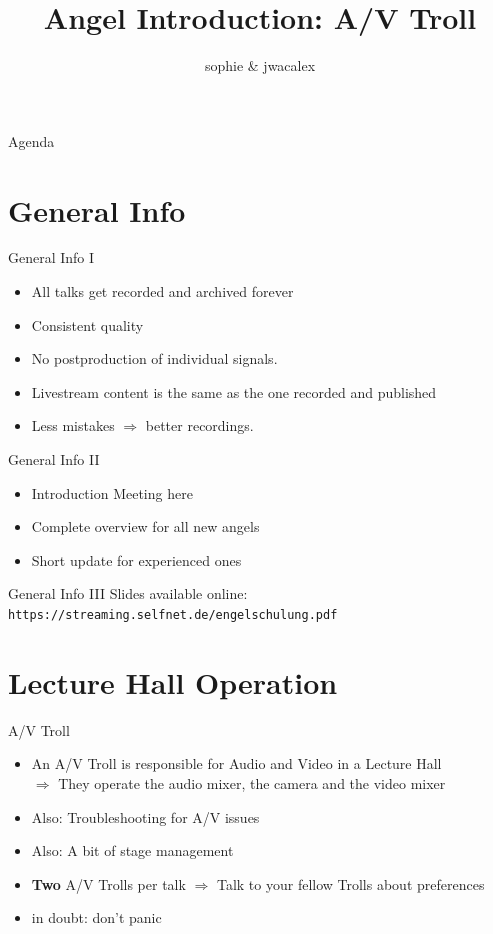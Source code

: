 \documentclass[aspectratio=169]{beamer}
\title{Angel Introduction: A/V Troll}
\author{sophie \& jwacalex}
\institute{C3VOC}
\begin{document}
\maketitle


\begin{frame}{Agenda}
\tableofcontents
\end{frame}


\section{General Info}
\begin{frame}{General Info I}
	\begin{itemize}
		\item All talks get recorded and archived forever
		\item Consistent quality
		\item No postproduction of individual signals.
		\item Livestream content is the same as the one recorded and published
		\item Less mistakes $\Rightarrow$ better recordings.
	\end{itemize}
\end{frame}


\begin{frame}{General Info II}
	\begin{itemize}
		\item Introduction Meeting here
		\item Complete overview for all new angels
		\item Short update for experienced ones
	\end{itemize}
\end{frame}

\begin{frame}{General Info III}
Slides available online: \texttt{https://streaming.selfnet.de/engelschulung.pdf}

	\begin{figure} 
		\centering
	\end{figure}
\end{frame}

\section{Lecture Hall Operation}
\begin{frame}{A/V Troll}
	\begin{itemize}
		\item An A/V Troll is responsible for Audio and Video in a Lecture Hall\\
		$\Rightarrow$ They operate the audio mixer, the camera and the video mixer
		\item Also: Troubleshooting for A/V issues
		\item Also: A bit of stage management
		\item \textbf{Two} A/V Trolls per talk $\Rightarrow$  Talk to your fellow Trolls about preferences
		\item in doubt: don't panic
	\end{itemize}
\end{frame}
\end{document}
